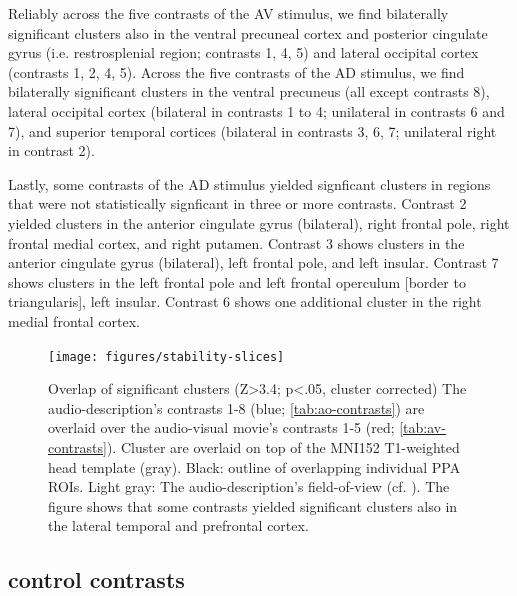 \documentclass[english]{article}
\begin{document}
Reliably across the five contrasts of the AV stimulus, we find bilaterally
significant clusters also in the ventral precuneal cortex and posterior
cingulate gyrus (i.e. restrosplenial region; contrasts 1, 4, 5) and lateral
occipital cortex (contrasts 1, 2, 4, 5).
Across the five contrasts of the AD stimulus, we find bilaterally
significant clusters in the ventral precuneus (all except contrasts 8), lateral
occipital cortex (bilateral in contrasts 1 to 4; unilateral in contrasts 6 and
7), and superior temporal cortices (bilateral in contrasts 3, 6, 7; unilateral
right in contrast 2).

Lastly, some contrasts of the AD stimulus yielded signficant clusters in regions
that were not statistically signficant in three or more contrasts.
%
Contrast 2 yielded clusters in the anterior cingulate gyrus
(bilateral), right frontal pole, right frontal medial cortex, and right
putamen.
%
Contrast 3 shows clusters in the anterior cingulate gyrus (bilateral), left
frontal pole, and left insular.
%
Contrast 7 shows clusters in the left frontal pole and left frontal operculum
[border to triangularis], left insular.
%
Contrast 6 shows one additional cluster in the right medial frontal cortex.


\begin{figure}[h!]
\centering
    \texttt{[image: figures/stability-slices]}
    \caption{Overlap of significant clusters (Z>3.4; p<.05, cluster corrected)
        The audio-description's contrasts 1-8 (blue; \ref{tab:ao-contrasts})
        are overlaid over the audio-visual movie's contrasts 1-5 (red;
        \ref{tab:av-contrasts}).
        Cluster are overlaid on top of the MNI152 T1-weighted head template
        (gray).
        Black: outline of overlapping individual PPA ROIs.
        Light gray: The audio-description's field-of-view (cf.
        \citep{hanke2014audiomovie}).
        The figure shows that some contrasts yielded significant clusters
        also in the lateral temporal and prefrontal cortex.
        }
    \label{fig:stability-slices}
\end{figure}


\subsection{control contrasts}

\end{document}
